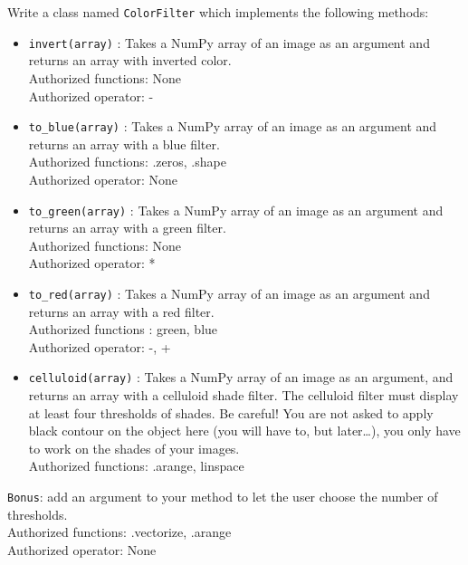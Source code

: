 \documentclass[]{article}
\begin{document}
Write a class named \texttt{ColorFilter} which implements the following
methods:

\begin{itemize}
\item
  \texttt{invert(array)} : Takes a NumPy array of an image as an
  argument and returns an array with inverted color.\\
  Authorized functions: None\\
  Authorized operator: -
\item
  \texttt{to\_blue(array)} : Takes a NumPy array of an image as an
  argument and returns an array with a blue filter.\\
  Authorized functions: .zeros, .shape\\
  Authorized operator: None
\item
  \texttt{to\_green(array)} : Takes a NumPy array of an image as an
  argument and returns an array with a green filter.\\
  Authorized functions: None\\
  Authorized operator: *
\item
  \texttt{to\_red(array)} : Takes a NumPy array of an image as an
  argument and returns an array with a red filter.\\
  Authorized functions : green, blue\\
  Authorized operator: -, +
\item
  \texttt{celluloid(array)} : Takes a NumPy array of an image as an
  argument, and returns an array with a celluloid shade filter. The
  celluloid filter must display at least four thresholds of shades. Be
  careful! You are not asked to apply black contour on the object here
  (you will have to, but later\ldots{}), you only have to work on the
  shades of your images.\\
  Authorized functions: .arange, linspace
\end{itemize}

\texttt{Bonus}: add an argument to your method to let the user choose
the number of thresholds.\\
Authorized functions: .vectorize, .arange\\
Authorized operator: None
\end{document}
